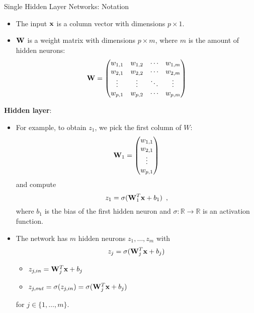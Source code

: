 \documentclass[11pt,compress,t,notes=noshow, xcolor=table]{beamer}
\begin{document}
\begin{vbframe}{Single Hidden Layer Networks: Notation}

\begin{itemize}
\item The input $\mathbf{x}$ is a column vector with dimensions $p \times 1$. 
\item $\mathbf{W}$ is a weight matrix with dimensions $p \times m$, where $m$ is the amount of hidden neurons:
$$\mathbf{W} =
     \begin{pmatrix}
      w_{1,1} & w_{1,2} & \cdots & w_{1,m} \\
      w_{2,1} & w_{2,2} & \cdots & w_{2,m} \\
      \vdots  & \vdots  & \ddots & \vdots  \\
      w_{p,1} & w_{p,2} & \cdots & w_{p,m}
     \end{pmatrix}$$
     \end{itemize}
     \framebreak
     \textbf{Hidden layer}:
     \begin{itemize}
\item For example, to obtain $z_1$, we pick the first column of $W$:
    $$\mathbf{W}_1 =
     \begin{pmatrix}
      w_{1,1} \\
      w_{2,1} \\
      \vdots  \\
      w_{p,1}
     \end{pmatrix}$$
and compute 
$$z_1 = \sigma(\mathbf{W}_1^T \mathbf{x} + b_1)\enspace,$$
 where $b_1$ is the bias of the first hidden neuron and $\sigma: \mathbb{R} \to \mathbb{R}$ is an activation function. 
\end{itemize}

  \begin{itemize}
    \vspace{4mm}
    \item The network has $m$ hidden neurons $z_1, \dots, z_m$ with
    $$ z_j = \sigma(\mathbf{W}_j^T \mathbf{x} + b_j)$$
    \vspace{-0.5cm}
    \begin{itemize}
    \item $z_{j,in}  = \mathbf{W}_j^T \mathbf{x} + b_j$
    \vspace{2mm}
    \item $z_{j,out} = \sigma(z_{j,in}) = \sigma(\mathbf{W}_j^T \mathbf{x} + b_j)$
    \end{itemize}
    \vspace{4mm}
    for $j \in \{1,\ldots,m\}$.
    \vspace{4mm}


\end{itemize}
\end{vbframe}
\end{document}
